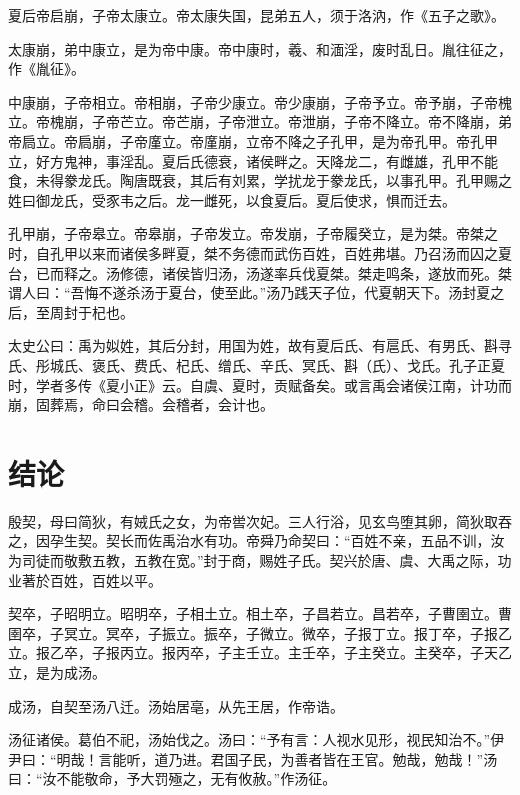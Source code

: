 \documentclass[UTF8,12pt,AutoFakeBold,fontset=fandol]{ctexart}
\begin{document}
	夏后帝启崩，子帝太康立。帝太康失国，昆弟五人，须于洛汭，作《五子之歌》。
	
	太康崩，弟中康立，是为帝中康。帝中康时，羲、和湎淫，废时乱日。胤往征之，作《胤征》。
	
	中康崩，子帝相立。帝相崩，子帝少康立。帝少康崩，子帝予立。帝予崩，子帝槐立。帝槐崩，子帝芒立。帝芒崩，子帝泄立。帝泄崩，子帝不降立。帝不降崩，弟帝扃立。帝扃崩，子帝廑立。帝廑崩，立帝不降之子孔甲，是为帝孔甲。帝孔甲立，好方鬼神，事淫乱。夏后氏德衰，诸侯畔之。天降龙二，有雌雄，孔甲不能食，未得豢龙氏。陶唐既衰，其后有刘累，学扰龙于豢龙氏，以事孔甲。孔甲赐之姓曰御龙氏，受豕韦之后。龙一雌死，以食夏后。夏后使求，惧而迁去。
	
	孔甲崩，子帝皋立。帝皋崩，子帝发立。帝发崩，子帝履癸立，是为桀。帝桀之时，自孔甲以来而诸侯多畔夏，桀不务德而武伤百姓，百姓弗堪。乃召汤而囚之夏台，已而释之。汤修德，诸侯皆归汤，汤遂率兵伐夏桀。桀走鸣条，遂放而死。桀谓人曰：“吾悔不遂杀汤于夏台，使至此。”汤乃践天子位，代夏朝天下。汤封夏之后，至周封于杞也。
	
	太史公曰：禹为姒姓，其后分封，用国为姓，故有夏后氏、有扈氏、有男氏、斟寻氏、彤城氏、褒氏、费氏、杞氏、缯氏、辛氏、冥氏、斟（氏）、戈氏。孔子正夏时，学者多传《夏小正》云。自虞、夏时，贡赋备矣。或言禹会诸侯江南，计功而崩，固葬焉，命曰会稽。会稽者，会计也。
	
	
	


	
	
	\newpage
	
	\section{结论\label{章节：黑洞吸积模型}}
	殷契，母曰简狄，有娀氏之女，为帝喾次妃。三人行浴，见玄鸟堕其卵，简狄取吞之，因孕生契。契长而佐禹治水有功。帝舜乃命契曰：“百姓不亲，五品不训，汝为司徒而敬敷五教，五教在宽。”封于商，赐姓子氏。契兴於唐、虞、大禹之际，功业著於百姓，百姓以平。
	
	契卒，子昭明立。昭明卒，子相土立。相土卒，子昌若立。昌若卒，子曹圉立。曹圉卒，子冥立。冥卒，子振立。振卒，子微立。微卒，子报丁立。报丁卒，子报乙立。报乙卒，子报丙立。报丙卒，子主壬立。主壬卒，子主癸立。主癸卒，子天乙立，是为成汤。
	
	成汤，自契至汤八迁。汤始居亳，从先王居，作帝诰。
	
	汤征诸侯。葛伯不祀，汤始伐之。汤曰：“予有言：人视水见形，视民知治不。”伊尹曰：“明哉！言能听，道乃进。君国子民，为善者皆在王官。勉哉，勉哉！”汤曰：“汝不能敬命，予大罚殛之，无有攸赦。”作汤征。
	
\end{document}
